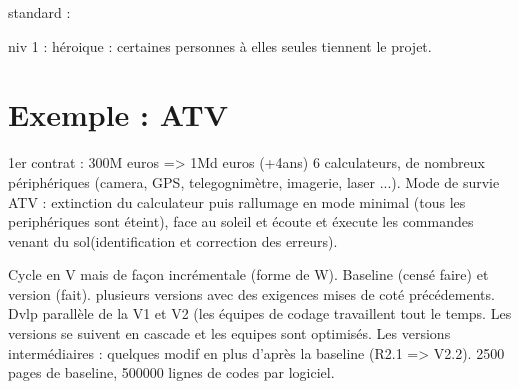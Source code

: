 \documentclass[a4paper,12pt]{article}
\begin{document}
standard :

niv 1 : héroique : certaines personnes à elles seules tiennent le projet.
\section{Exemple : ATV}

1er contrat : 300M euros => 1Md euros (+4ans)
6 calculateurs, de nombreux périphériques (camera, GPS, telegognimètre, imagerie, laser ...).
Mode de survie ATV : extinction du calculateur puis rallumage en mode minimal (tous les periphériques sont éteint), face au soleil et écoute et éxecute les commandes venant du sol(identification et correction des erreurs).

Cycle en V mais de façon incrémentale (forme de W).
Baseline (censé faire) et version (fait). plusieurs versions avec des exigences mises de coté précédements. Dvlp parallèle de la V1 et V2 (les équipes de codage travaillent tout le temps. Les versions se suivent en cascade et les equipes sont optimisés. Les versions intermédiaires : quelques modif en plus d'après la baseline (R2.1 => V2.2). 
2500 pages de baseline, 500000 lignes de codes par logiciel.
\end{document}
